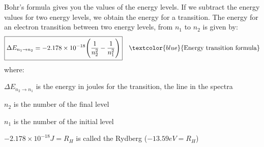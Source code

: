 \documentclass[main.tex]{subfiles}
\newcommand\chapterlabel{electrons}
\begin{document}
\begin{description}
\begin{center}
{}\end{center}


 

 \item[\docfilehook{Bohn's formula for energy transitions}{ }]
Bohr's formula gives you the values of the energy levels. If we subtract the energy values for two energy levels, we obtain the energy for a transition. 
The energy for an electron transition between two energy levels, from $n_1$ to $n_2$ is given by:
\begin{equation*}
\boxed{  \Delta E_{n_1\rightarrow n_2}=-2.178\times 10^{-18} \Bigg( \frac{1}{n_2^2}-\frac{1}{n_1^2}\Bigg)  } \quad \textcolor{blue}{\text{Energy transition formula}}
\end{equation*}
where:
\begin{where}
 \item $\Delta E_{{n_2}\rightarrow n{_1}}$   is the energy in joules for the transition, the line in the spectra
 \item $n_2$  is the number of the final level
  \item $n_1$  is the number of the initial level
    \item $-2.178\times 10^{-18}J=R_H$  is called the Rydberg ($-13.59eV=R_H$)

\end{where}



\end{description}
\end{document}
